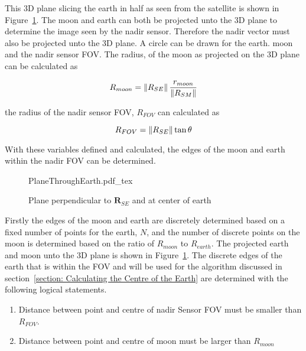 This 3D plane slicing the earth in half as seen from the satellite is shown in Figure~\ref{fig:PlaneThroughEarth}. The moon and earth can both be projected unto the 3D plane to determine the image seen by the nadir sensor. Therefore the nadir vector must also be projected unto the 3D plane. A circle can be drawn for the earth. moon and the nadir sensor FOV. The radius, of the moon as projected on the 3D plane can be calculated as 

\begin{equation}
	R_{moon} = \left\lVert R_{SE}\right\rVert \frac{r_{moon}}{\left\lVert R_{SM}\right\rVert}
\end{equation}

the radius of the nadir sensor FOV, $R_{FOV}$ can calculated as 

\begin{equation}
	R_{FOV} = \left\lVert R_{SE}\right\rVert \tan \theta
\end{equation}

With these variables defined and calculated, the edges of the moon and earth within the nadir FOV can be determined.


\begin{figure}[!hbt]
	\centering
	\def\svgwidth{14cm}
	{PlaneThroughEarth.pdf_tex}
	\caption{Plane perpendicular to $\mathbf{R}_{SE}$ and at center of earth}
	\label{fig:PlaneThroughEarth}
\end{figure}

Firstly the edges of the moon and earth are discretely determined based on a fixed number of points for the earth, $N$, and the number of discrete points on the moon is determined based on the ratio of $R_{moon}$ to $R_{earth}$. The projected earth and moon unto the 3D plane is shown in Figure~\ref{fig:PlaneThroughEarth}. The discrete edges of the earth that is within the FOV and will be used for the algorithm discussed in section~\ref{section: Calculating the Centre of the Earth} are determined with the following logical statements.
\begin{enumerate}
	\item Distance between point and centre of nadir Sensor FOV must be smaller than $R_{FOV}$.
	\item Distance between point and centre of moon must be larger than $R_{moon}$
\end{enumerate}

